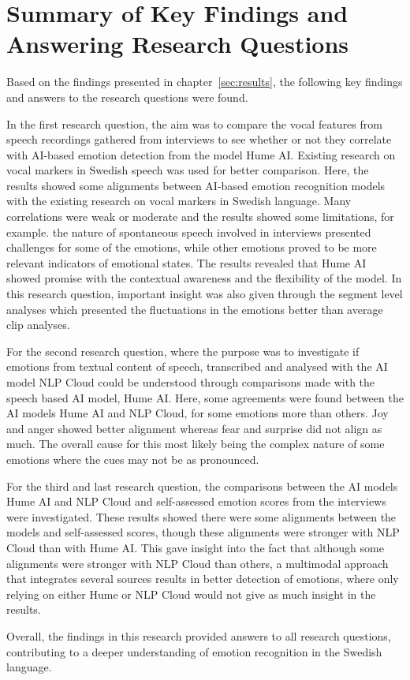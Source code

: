 \section{Summary of Key Findings and Answering Research Questions}
\label{sec:con-key-findings}
Based on the findings presented in chapter~\ref{sec:results}, the following key findings and answers to the research questions were found.

In the first research question, the aim was to compare the vocal features from speech recordings gathered from interviews to see whether or not they correlate with AI-based emotion detection from the model Hume AI. Existing research on vocal markers in Swedish speech was used for better comparison.
Here, the results showed some alignments between AI-based emotion recognition models with the existing research on vocal markers in Swedish language. Many correlations were weak or moderate and the results showed some limitations, for example. the nature of spontaneous speech involved in interviews presented challenges for some of the emotions, while other emotions proved to be more relevant indicators of emotional states. The results revealed that Hume AI showed promise with the contextual awareness and the flexibility of the model. 
In this research question, important insight was also given through the segment level analyses which presented the fluctuations in the emotions better than average clip analyses.

For the second research question, where the purpose was to investigate if emotions from textual content of speech, transcribed and analysed with the AI model NLP Cloud could be understood through comparisons made with the speech based AI model, Hume AI. Here, some agreements were found between the AI models Hume AI and NLP Cloud, for some emotions more than others. Joy and anger showed better alignment whereas fear and surprise did not align as much. The overall cause for this most likely being the complex nature of some emotions where the cues may not be as pronounced.

For the third and last research question, the comparisons between the AI models Hume AI and NLP Cloud and self-assessed emotion scores from the interviews were investigated. These results showed there were some alignments between the models and self-assessed scores, though these alignments were stronger with NLP Cloud than with Hume AI.
This gave insight into the fact that although some alignments were stronger with NLP Cloud than others, a multimodal approach that integrates several sources results in better detection of emotions, where only relying on either Hume or NLP Cloud would not give as much insight in the results.

Overall, the findings in this research provided answers to all research questions, contributing to a deeper understanding of emotion recognition in the Swedish language.